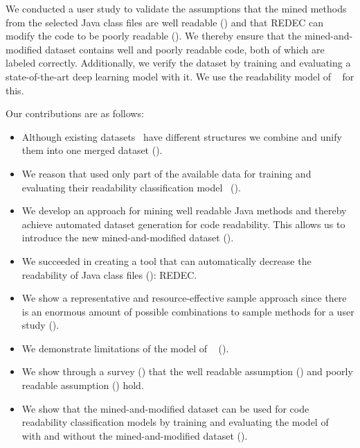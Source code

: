 \documentclass[%
class=scrreprt,
chapterprefix=false,%
open=right,%
twoside=true,%
paper=a4,%
logofile={Logo\_zentral\_farbig\_EN.png},%
thesistype=master,%
UKenglish,%
]{se2thesis}
\theoremstyle{definition}
\newcommand{\citeolddataset}{\cite{buse2009learning, dorn2012general, scalabrino2018comprehensive}\xspace}
\newcommand{\rdh}{REDEC\xspace}
\begin{document}
	We conducted a user study to validate the assumptions that the mined methods from the selected Java class files are well readable () and that \rdh can modify the code to be poorly readable (). 
	We thereby ensure that the mined-and-modified dataset contains well and poorly readable code, both of which are labeled correctly.
	Additionally, we verify the dataset by training and evaluating a state-of-the-art deep learning model with it. We use the readability model of \citeauthor{mi2022towards}~\cite{mi2022towards} for this.
		
	Our contributions are as follows:
	\begin{itemize}
		\item Although existing datasets~\citeolddataset have different structures we combine and unify them into one merged dataset ().
		\item We reason that \citeauthor{mi2022towards} used only part of the available data for training and evaluating their readability classification model~\cite{mi2022towards} ().
		\item We develop an approach for mining well readable Java methods and thereby achieve automated dataset generation for code readability. This allows us to introduce the new mined-and-modified dataset ().
		\item We succeeded in creating a tool that can automatically decrease the readability of Java class files (): \rdh.
		\item We show a representative and resource-effective sample approach since there is an enormous amount of possible combinations to sample methods for a user study ().
		\item We demonstrate limitations of the model of \citeauthor{mi2022towards}~\cite{mi2022towards} ().
		\item We show through a survey () that the well readable assumption () and poorly readable assumption () hold.
		\item We show that the mined-and-modified dataset can be used for code readability classification models by training and evaluating the model of \citeauthor{mi2022towards}~\cite{mi2022towards} with and without the mined-and-modified dataset ().
	\end{itemize}
	
\end{document}
